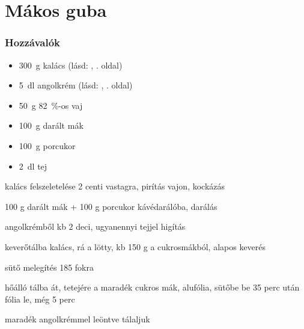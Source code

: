 \newpage
\section{Mákos guba} \label{sec:makos_guba}

\subsubsection*{Hozzávalók}
\begin{itemize}
    \item \qty{300}{\g} kalács (lásd: , \pageref{sec:kalacs}. oldal)
    \item \qty{5}{\deci\l} angolkrém (lásd: , \pageref{sec:angolkem}. oldal)
    \item \qty{50}{\g} \qty{82}{\percent}-os vaj
    \item \qty{100}{\g} darált mák
    \item \qty{100}{\g} porcukor
    \item \qty{2}{\deci\l} tej
\end{itemize}

kalács felszeletelése 2 centi vastagra, pirítás vajon, kockázás

100 g darált mák + 100 g porcukor kávédarálóba, darálás

angolkrémből kb 2 deci, ugyanennyi tejjel higítás

keverőtálba kalács, rá a lötty, kb 150 g a cukrosmákból, alapos keverés

sütő melegítés 185 fokra

hőálló tálba át, tetejére a maradék cukros mák, alufólia, sütőbe be 35 perc után fólia le, még 5 perc

maradék angolkrémmel leöntve tálaljuk
